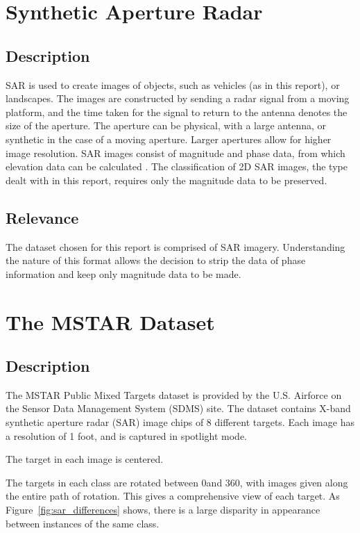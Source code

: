 \section{Synthetic Aperture Radar}
\subsection{Description}
SAR is used to create images of objects, such as vehicles (as in this report), or landscapes. The images are constructed by sending a radar signal from a moving platform, and the time taken for the signal to return to the antenna denotes the size of the aperture. The aperture can be physical, with a large antenna, or synthetic in the case of a moving aperture. Larger apertures allow for higher image resolution. SAR images consist of magnitude and phase data, from which elevation data can be calculated\cite{curlander1991synthetic} . The classification of 2D SAR images, the type dealt with in this report, requires only the magnitude data to be preserved.
\subsection{Relevance}
The dataset chosen for this report is comprised of SAR imagery. Understanding the nature of this format allows the decision to strip the data of phase information and keep only magnitude data to be made. 

\section{The MSTAR Dataset}\label{lit:MSTAR}
\subsection{Description}
The MSTAR Public Mixed Targets dataset is provided by the U.S. Airforce on the Sensor Data Management System (SDMS) site\cite{MSTAR}. The dataset contains X-band synthetic aperture radar (SAR) image chips of 8 different targets. Each image has a resolution of 1 foot, and is captured in spotlight mode. 

The target in each image is centered.

The targets in each class are rotated between 0\degree and 360\degree, with images given along the entire path of rotation. This gives a comprehensive view of each target. As Figure~\ref{fig:sar_differences} shows, there is a large disparity in appearance between instances of the same class.

